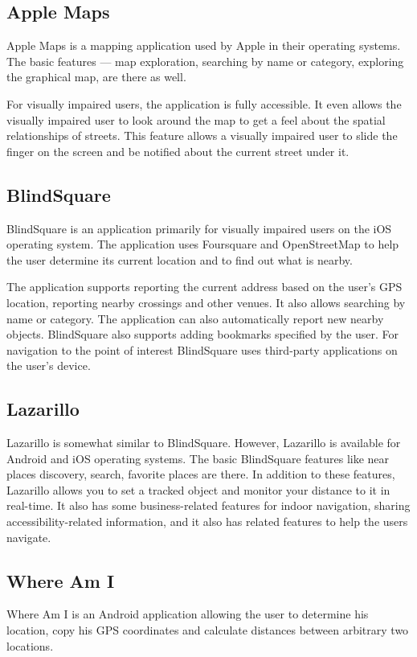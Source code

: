 \documentclass[nolof,digital]{fithesis3}
\begin{document}
\subsection{Apple Maps}
Apple Maps \parencite{applemaps} is a mapping application used by Apple in their operating systems. The basic features --- map exploration, searching by name or category, exploring the graphical map, are there as well.

For visually impaired users, the application is fully accessible. It even allows the visually impaired user to look around the map to get a feel about the spatial relationships of streets. This feature allows a visually impaired user to slide the finger on the screen and be notified about the current street under it.
\subsection{BlindSquare}
BlindSquare \parencite{blindsquare} is an application primarily for visually impaired users on the iOS operating system. The application uses Foursquare and OpenStreetMap to help the user determine its current location and to find out what is nearby.

The application supports reporting the current address based on the user's GPS location, reporting nearby crossings and other venues. It also allows searching by name or category. The application can also automatically report new nearby objects. BlindSquare also supports adding bookmarks specified by the user. For navigation to the point of interest BlindSquare uses third-party applications on the user's device.
\subsection{Lazarillo}
Lazarillo \parencite{lazarillo} is somewhat similar to BlindSquare. However, Lazarillo is available for Android and iOS operating systems. The basic BlindSquare features like near places discovery, search, favorite places are there. In addition to these features, Lazarillo allows you to set a tracked object and monitor your distance to it in real-time. It also has some business-related features for indoor navigation, sharing accessibility-related information, and it also has related features to help the users navigate.
\subsection{Where Am I}
Where Am I \parencite{whereami} is an Android application allowing the user to determine his location, copy his GPS coordinates and calculate distances between arbitrary two locations.
\end{document}
